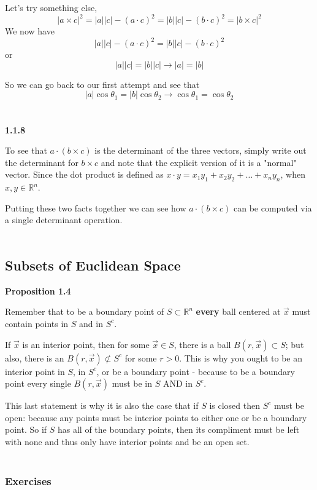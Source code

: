 Let's try something else,
$$
|a\times c|^2 = |a||c| - (a\cdot c)^2
= |b||c| - (b\cdot c)^2 = |b \times c|^2
$$
We now have
$$
|a||c| - (a\cdot c)^2 = |b||c| - (b\cdot c)^2
$$
or
$$
|a||c| = |b||c| \rightarrow |a| = |b|
$$

So we can go back to our first attempt and see that
$$
|a| \cos{\theta_1} = |b| \cos{\theta_2} \rightarrow \cos{\theta_1} = \cos{\theta_2}
$$
\\~\\



\textbf{1.1.8}

To see that $a\cdot(b\times c)$ is the determinant of the three vectors,
simply write out the determinant for $b\times c$ and note that the explicit version of it
is a "normal" vector.
Since the dot product is defined as $x\cdot y = x_1 y_1 + x_2 y_2 + \ldots + x_n y_n$, when
$x, y \in \mathbb{R}^n$.

Putting these two facts together we can see how $a\cdot(b\times c)$ can be computed via a single determinant
operation.
\\~\\



\subsection{Subsets of Euclidean Space}

\textbf{Proposition 1.4}

Remember that to be a boundary point of $S \subset \mathbb{R}^n$ \textbf{every}
ball centered at $\vec{x}$ must contain points in $S$ and in $S^c$.

If $\vec{x}$ is an interior point, then for some $\vec{x} \in S$,
there is a ball $B(r,\vec{x}) \subset S$;
but also, there is an $B(r, \vec{x}) \not\subset S^c$ for some $r>0$.
This is why you ought to be an interior point in $S$, in $S^c$, or be a boundary point
- because to be a boundary point every single $B(r, \vec{x})$ must be in $S$ AND in $S^c$.

This last statement is why it is also the case that if $S$ is closed then $S^c$ must be open:
because any points must be interior points to either one or be a boundary point.
So if $S$ has all of the boundary points, then its compliment must be left with none and thus only
have interior points and be an open set.
\\~\\







\subsubsection{Exercises}